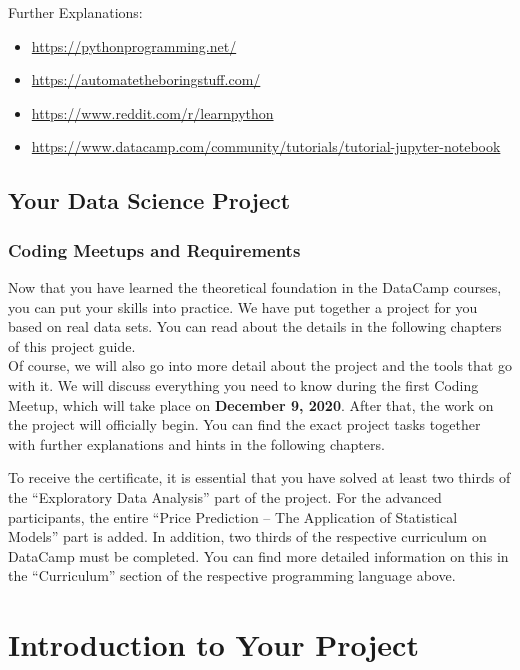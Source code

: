 \documentclass[
  11pt,
]{book}
\providecommand{\tightlist}{%
  \setlength{\itemsep}{0pt}\setlength{\parskip}{0pt}}
\begin{document}
Further Explanations:

\begin{itemize}
\tightlist
\item
  \url{https://pythonprogramming.net/}
\item
  \url{https://automatetheboringstuff.com/}
\item
  \url{https://www.reddit.com/r/learnpython}
\item
  \url{https://www.datacamp.com/community/tutorials/tutorial-jupyter-notebook}
\end{itemize}

\hypertarget{your-data-science-project}{%
\section{Your Data Science Project}\label{your-data-science-project}}

\hypertarget{coding-meetups-and-requirements}{%
\subsection{Coding Meetups and Requirements}\label{coding-meetups-and-requirements}}

Now that you have learned the theoretical foundation in the DataCamp courses, you can put your skills into practice. We have put together a project for you based on real data sets. You can read about the details in the following chapters of this project guide.\\
Of course, we will also go into more detail about the project and the tools that go with it. We will discuss everything you need to know during the first Coding Meetup, which will take place on \textbf{December 9, 2020}. After that, the work on the project will officially begin.
You can find the exact project tasks together with further explanations and hints in the following chapters.

To receive the certificate, it is essential that you have solved at least two thirds of the ``Exploratory Data Analysis'' part of the project. For the advanced participants, the entire ``Price Prediction -- The Application of Statistical Models'' part is added. In addition, two thirds of the respective curriculum on DataCamp must be completed. You can find more detailed information on this in the ``Curriculum'' section of the respective programming language above.

\newpage

\hypertarget{introduction-to-your-project}{%
\chapter{Introduction to Your Project}\label{introduction-to-your-project}}
\end{document}
